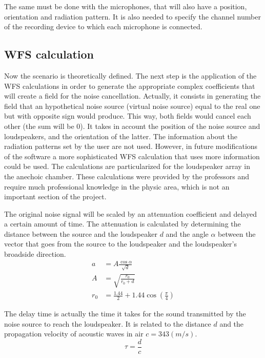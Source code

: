 The same must be done with the microphones, that will also have a position, orientation and radiation pattern. It is also needed to specify the channel number of the recording device to which each microphone is connected.
 
\subsection{WFS calculation}
\label{WFScalculation}

Now the scenario is theoretically defined. The next step is the application of the WFS calculations in order to generate the appropriate complex coefficients that will create a field for the noise cancellation. Actually, it consists in generating the field that an hypothetical noise source (virtual noise source) equal to the real one but with opposite sign would produce. This way, both fields would cancel each other (the sum will be $0$). It takes in account the position of the noise source and loudspeakers, and the orientation of the latter. The information about the radiation patterns set by the user are not used. However, in future modifications of the software a more sophisticated WFS calculation that uses more information could be used. The calculations are particularized for the loudspeaker array in the anechoic chamber. These calculations were provided by the professors and require much professional knowledge in the physic area, which is not an important section of the project.

The original noise signal will be scaled by an attenuation coefficient and delayed a certain amount of time. The attenuation is calculated by determining the distance between the source and the loudspeaker $d$ and the angle $\alpha$ between the vector that goes from the source to the loudspeaker and the loudspeaker's broadside direction.
\begin{equation}
\begin{aligned}
a &= A\frac{\cos\alpha}{\sqrt{d}} \\
A &= \sqrt{\frac{r_0}{r_0 + d}}\\
r_0 &= \frac{1.44}{2} + 1.44 \cos\left( \frac{\pi}{4} \right)
\end{aligned}
\label{WFScalcEq}
\end{equation}

The delay time is actually the time it takes for the sound transmitted by the noise source to reach the loudspeaker. It is related to the distance $d$ and the propagation velocity of acoustic waves in air $c = 343 (m/s)$.
\begin{equation}
\tau = \frac{d}{c} \label{WFScalcEqDelay}
\end{equation}

